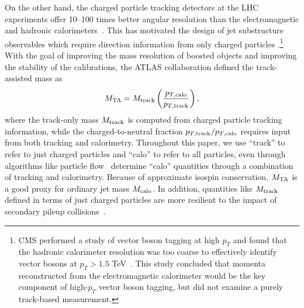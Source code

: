 \documentclass[letterpaper,11pt]{article}
\begin{document}
On the other hand, the charged particle tracking detectors at the LHC experiments offer 10--100 times better angular resolution than the electromagnetic and hadronic calorimeters~\cite{Asquith:2018igt,Larkoski:2017jix}.
%
This has motivated the design of jet substructure observables which require direction information from only charged particles
\cite{Katz:2010mr,Son:2012mb,Calkins:2013ega,Schaetzel:2013vka,Larkoski:2015yqa,Spannowsky:2015eba,Bressler:2015uma}.\footnote{CMS performed a study of vector boson tagging at high $p_T$ and found that the hadronic calorimeter resolution was too coarse to effectively identify vector bosons at $p_T > 1.5$ TeV~\cite{CMS-PAS-JME-14-002}.  This study concluded that momenta reconstructed from the electromagnetic calorimeter would be the key component of high-$p_T$ vector boson tagging, but did not examine a purely track-based measurement.}
%
With the goal of improving the mass resolution of boosted objects and improving the stability of the calibrations, the ATLAS collaboration defined the track-assisted mass as~\cite{ATLAS:2016vmy}
\begin{equation}
\label{eq:tam-definition}
M_{\rm TA}  = M_{\rm track} \left(\frac{p_{T,\rm calo}}{p_{T,\rm track}}\right),
\end{equation}
where the track-only mass $M_{\rm track}$ is computed from charged particle tracking information, while the charged-to-neutral fraction $p_{T,\rm track}/p_{T,\rm calo}$ requires input from both tracking and calorimetry.
%
Throughout this paper, we use ``track'' to refer to just charged particles and ``calo'' to refer to all particles, even through algorithms like particle flow~\cite{Aaboud:2017aca,Sirunyan:2017ulk} determine ``calo'' quantities through a combination of tracking and calorimetry.
%
Because of approximate isospin conservation, $M_{\rm TA}$ is a good proxy for ordinary jet mass $M_{\rm calo}$. 
%
In addition, quantities like $M_{\rm track}$ defined in terms of just charged particles are more resilient to the impact of secondary pileup collisions~\cite{Asquith:2018igt,Larkoski:2017jix}.

\end{document}
